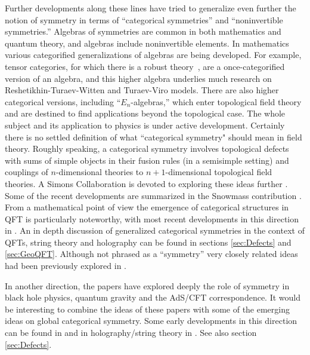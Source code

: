 \documentclass[12pt]{article}
\begin{document}
Further developments along these lines have   tried to generalize even
further the notion of symmetry in terms of ``categorical symmetries'' and ``noninvertible symmetries.''  Algebras of symmetries are common in both mathematics and quantum theory, and algebras include noninvertible elements.  In mathematics various categorified generalizations of algebras are being developed.  For example, tensor categories, for which there is a robust theory~\cite{Etingofbook}, are a once-categorified version of an algebra, and this higher algebra underlies much research on Reshetikhin-Turaev-Witten and Turaev-Viro models.  There are also higher categorical versions, including ``$E_n$-algebras,'' which enter topological field theory and are destined to find applications beyond the topological case.  The whole subject and its application to physics is under active development.  Certainly there is no settled definition of what ``categorical symmetry" should mean in field theory. Roughly speaking, a categorical symmetry involves topological defects with sums of simple objects in
their fusion rules (in a semisimple setting) and couplings of $n$-dimensional theories to $n+1$-dimensional topological field
theories.
A Simons Collaboration is devoted to exploring these ideas further \cite{SimonsCollab:CategoricalSymmetry}. 
Some of the recent developments are summarized in the Snowmass contribution \cite{Cordova:2022ruw}. 
From a mathematical point of view the emergence of categorical structures in QFT is particularly noteworthy, with most recent developments in this direction in  
\cite{Ji:2019jhk,Komargodski:2020mxz,Kong:2020cie,Thorngren:2019iar,Thorngren:2021yso, Bhardwaj:2022yxj, Bhardwaj:2022lsg, Bartsch:2022mpm, Lin:2022dhv, Freed:2022qnc}. 
An in depth discussion of generalized categorical symmetries in the context of QFTs, string theory and holography can be found in sections \ref{sec:Defects} and \ref{sec:GeoQFT}.
Although not phrased as a ``symmetry'' very closely related ideas had been previously explored in
\cite{Brunner:2014lua,Chang:2018iay,Lin:2019hks}.








In another direction, the papers \cite{Banks:2010zn,Harlow:2018tng,Harlow:2018jwu}
have explored deeply the role of symmetry in black hole physics, quantum gravity
and the  AdS/CFT correspondence. It would be interesting to combine the
ideas of these papers with some of the emerging ideas on global categorical
symmetry. Some early developments in this direction can be found in
\cite{Heidenreich:2021tna} and in holography/string theory in \cite{Apruzzi:2022rei, GarciaEtxebarria:2022vzq}. See also section \ref{sec:Defects}.
\end{document}

